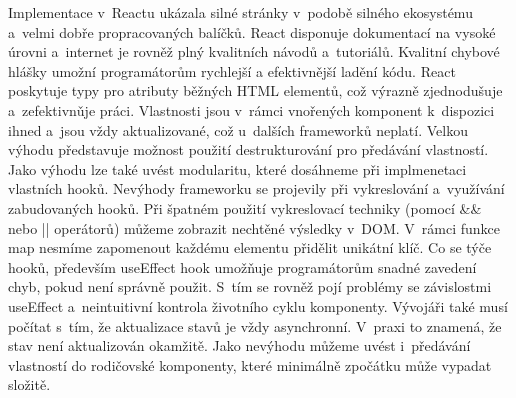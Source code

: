 Implementace v~Reactu ukázala silné stránky v~podobě silného ekosystému a~velmi dobře propracovaných balíčků. 
React disponuje dokumentací na vysoké úrovni a~internet je rovněž plný kvalitních návodů a~tutoriálů. 
Kvalitní chybové hlášky umožní programátorům rychlejší a efektivnější ladění kódu. 
React poskytuje typy pro atributy běžných HTML elementů, což výrazně zjednodušuje a~zefektivnǔje práci. 
Vlastnosti jsou v~rámci vnořených komponent k~dispozici ihned a~jsou vždy aktualizované, což u~dalších frameworků neplatí. 
Velkou výhodu představuje možnost použití destrukturování pro předávání vlastností. 
Jako výhodu lze také uvést modularitu, které dosáhneme při implmenetaci vlastních hooků. 
Nevýhody frameworku se projevily při vykreslování a~využívání zabudovaných hooků. 
Při špatném použití vykreslovací techniky (pomocí \&\& nebo || operátorů) můžeme zobrazit nechtěné výsledky v~DOM. 
V~rámci funkce map nesmíme zapomenout každému elementu přidělit unikátní klíč. 
Co se týče hooků, především useEffect hook umožňuje programátorům snadné zavedení chyb, pokud není správně použit. 
S~tím se rovněž pojí problémy se závislostmi useEffect a~neintuitivní kontrola životního cyklu komponenty. 
Vývojáři také musí počítat s~tím, že aktualizace stavů je vždy asynchronní. V~praxi to znamená, že stav není aktualizován okamžitě. 
Jako nevýhodu můžeme uvést i~předávání vlastností do rodičovské komponenty, které minimálně zpočátku může vypadat složitě.


